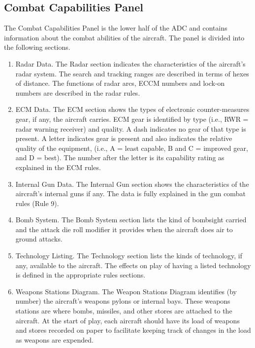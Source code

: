 \subsection{Combat Capabilities Panel}

The Combat Capabilities Panel is the lower half of the ADC and contains information about the combat abilities of the aircraft.  The panel is divided into the following sections.

\begin{enumerate}[resume]

    \item Radar Data. The Radar section indicates the characteristics of the aircraft's radar system. The search and tracking ranges are described in terms of hexes of distance. The functions of radar arcs, ECCM numbers and lock-on numbers are described in the radar rules.

    \item ECM Data. The ECM section shows the types of electronic counter-measures gear, if any, the aircraft carries. ECM gear is identified by type (i.e., RWR = radar warning receiver) and quality. A dash indicates no gear of that type is present. A letter indicates gear is present and also indicates the relative quality of the equipment, (i.e., A = least capable, B and C = improved gear, and D = best). The number after the letter is its capability rating as explained in the ECM rules.

    \item Internal Gun Data. The Internal Gun section shows the characteristics of the aircraft's internal guns if any. The data is fully explained in the gun combat rules (Rule 9).

    \item Bomb System. The Bomb System section lists the kind of bombsight carried and the attack die roll modifier it provides when the aircraft does air to ground attacks.

    \item Technology Listing. The Technology section lists the kinds of technology, if any, available to the aircraft. The effects on play of having a listed technology is defined in the appropriate rules sections.

    \item Weapons Stations Diagram. The Weapon Stations Diagram identifies (by number) the aircraft's weapons pylons or internal bays. These weapons stations are where bombs, missiles, and other stores are attached to the aircraft. At the start of play, each aircraft should have its load of weapons and stores recorded on paper to facilitate keeping track of changes in the load as weapons are expended.


\end{enumerate}
